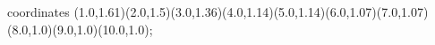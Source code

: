 					coordinates { (1.0,1.61)(2.0,1.5)(3.0,1.36)(4.0,1.14)(5.0,1.14)(6.0,1.07)(7.0,1.07)(8.0,1.0)(9.0,1.0)(10.0,1.0)};